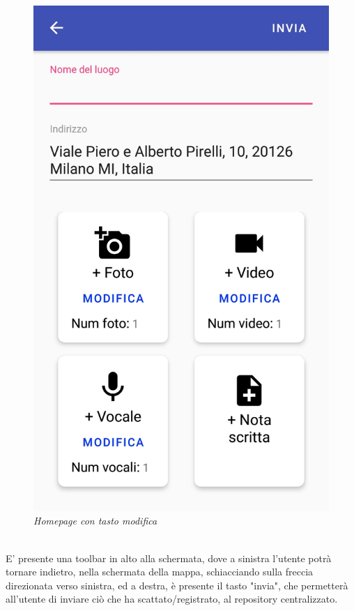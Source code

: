 \begin{figure}[!h]
    \centering
	\includegraphics[scale=0.15]{Tesi/images/HomepageModifica.jpg}
	\caption{\textit{Homepage con tasto modifica}}
	\label{fig:homepagemodifica}
\end{figure}
\\E' presente una toolbar in alto alla schermata, dove a sinistra l'utente potrà tornare indietro, nella schermata della mappa, schiacciando sulla freccia direzionata verso sinistra, ed a destra, è presente il tasto "invia", che permetterà all'utente di inviare ciò che ha scattato/registrato, al repository centralizzato.
